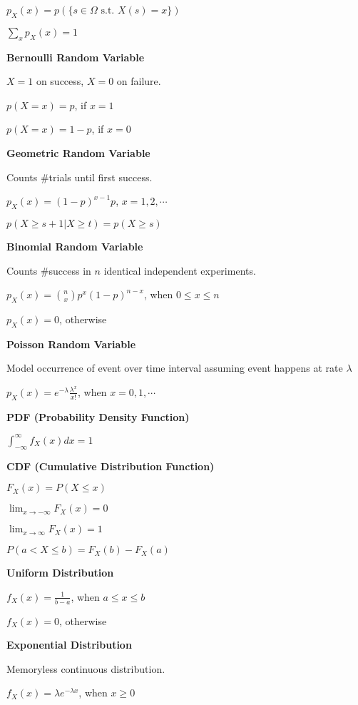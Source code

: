 \documentclass[10pt]{article}
\begin{document}
\begin{multicols*}{3}
$p_X(x)=p(\{s\in \Omega\text{ s.t. }X(s)=x\})$

$\sum_xp_X(x)=1$



{\bf Bernoulli Random Variable}

$X=1$ on success, $X=0$ on failure.

$p(X=x) = p$, if $x=1$

$p(X=x) = 1-p$, if $x=0$



{\bf Geometric Random Variable}

Counts \#trials until first success.

$p_X(x)=(1-p)^{x-1}p$, $x=1,2,\cdots$

$p(X\geq s+1|X\geq t)=p(X\geq s)$



{\bf Binomial Random Variable}

Counts \#success in $n$ identical independent experiments.

$p_X(x)={n\choose x}p^x(1-p)^{n-x}$, when $0\leq x\leq n$

$p_X(x)=0$, otherwise



{\bf Poisson Random Variable}

Model occurrence of event over time interval assuming event happens at rate $\lambda$

$p_X(x)=e^{-\lambda}\frac{\lambda^x}{x!}$, when $x=0,1,\cdots$



{\bf PDF (Probability Density Function)}

$\int_{-\infty}^\infty f_X(x)dx=1$



{\bf CDF (Cumulative Distribution Function)}

$F_X(x)=P(X\leq x)$

$\lim_{x\to -\infty}F_X(x)=0$

$\lim_{x\to\infty}F_X(x)=1$

$P(a<X\leq b)=F_X(b)-F_X(a)$



{\bf Uniform Distribution}

$f_X(x)=\frac{1}{b-a}$, when $a\leq x\leq b$

$f_X(x)=0$, otherwise



{\bf Exponential Distribution}

Memoryless continuous distribution.

$f_X(x)=\lambda e^{-\lambda x}$, when $x\geq 0$


\end{multicols*}
\end{document}
